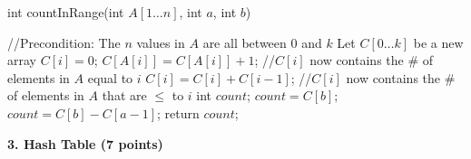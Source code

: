 \documentclass[12pt]{elsart}
\begin{document}
\begin{enumerate}
\begin{algorithm}
\caption{int countInRange(int $A[1\ldots n]$, int $a$, int $b$)}
\begin{algorithmic}[1]
  \State //Precondition: The $n$ values in $A$ are all between $0$ and $k$
  \State Let $C[0\ldots k]$ be a new array
    \State $C[i]=0$;
  \EndFor
    \State $C[A[i]]=C[A[i]]+1$;
  \EndFor
  \State //$C[i]$ now contains the \# of elements in $A$ equal to $i$
    \State $C[i]=C[i]+C[i-1]$;
  \EndFor
  \State //$C[i]$ now contains the \# of elements in $A$ that are $\leq$ to $i$
  \State int $count$;
    \State $count = C[b]$;
  \Else
    \State $count = C[b] - C[a - 1]$;
  \EndIf
  \State return $count$;
\end{algorithmic}
\end{algorithm}
\end{enumerate}

{\bf 3.  Hash Table (7 points)}
\end{document}
